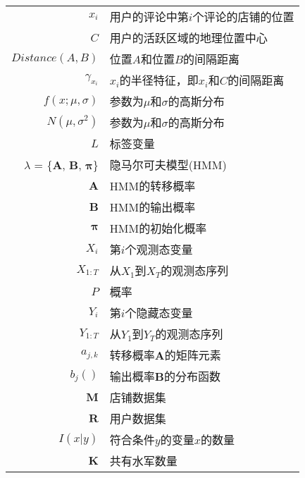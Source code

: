 \begin{nomenclaturename}
\label{chap:symb}

\begin{longtable}{rl}
$x_i$ &  用户的评论中第$i$个评论的店铺的位置\\
$C$ &  用户的活跃区域的地理位置中心\\
$Distance(A, B)$ & 位置$A$和位置$B$的间隔距离 \\
$\gamma_{x_i}$ &  $x_i$的半径特征，即$x_i$和$C$的间隔距离\\
$f(x;\mu,\sigma)$ & 参数为$\mu$和$\sigma$的高斯分布\\
$N(\mu, \sigma^2)$ & 参数为$\mu$和$\sigma$的高斯分布 \\
$L$ &  标签变量\\
$\lambda$ = \{$\mathbf{A}$, $\mathbf{B}$, $\mathbf{\pi}$\} &  隐马尔可夫模型(HMM)\\
$\mathbf{A}$ &  HMM的转移概率 \\
$\mathbf{B}$ &  HMM的输出概率 \\
$\mathbf{\pi}$ &  HMM的初始化概率\\
$X_i$ &  第$i$个观测态变量\\
$X_{1:T}$ &  从$X_1$到$X_T$的观测态序列 \\
$P$ & 概率 \\
$Y_i$ &  第$i$个隐藏态变量\\
$Y_{1:T}$ &  从$Y_1$到$Y_T$的观测态序列 \\
$a_{j,k}$ &  转移概率$\mathbf{A}$的矩阵元素 \\
$b_j()$ &  输出概率$\mathbf{B}$的分布函数 \\
$\mathbf{M}$ &  店铺数据集\\
$\mathbf{R}$ &  用户数据集\\
$I(x|y)$ &  符合条件$y$的变量$x$的数量 \\
$\mathbf{K}$ & 共有水军数量\\
\end{longtable}

\end{nomenclaturename}
